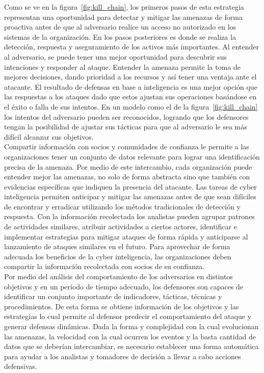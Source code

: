 Como se ve en la figura~\ref{fig:kill_chain}, los primeros pasos de esta estrategia representan una 
oportunidad para detectar y mitigar las amenazas de forma proactiva antes de que 
al adversario realice un acceso no autorizado en los sistemas de la 
organización. En los pasos posteriores es donde se realiza la detección, 
respuesta y aseguramiento de los activos más importantes. Al entender al 
adversario, se puede tener una mejor oportunidad para descubrir sus intenciones 
y responder al ataque. Entender la amenaza permite la toma de mejores 
decisiones, dando prioridad a los recursos y así tener una ventaja ante el atacante. 
El resultado de defensas en base a inteligencia es una mejor opción que las 
respuestas a los ataques dado que estos ajustan sus operaciones basándose en el 
éxito o falla de sus intentos. En un modelo como el de la figura~\ref{fig:kill_chain} los intentos 
del adversario pueden ser reconocidos, logrando que los defensores tengan la 
posibilidad de ajustar sus tácticas para que al adversario le sea más 
difícil alcanzar sus objetivos.\\

Compartir información con socios y comunidades de confianza le permite a las 
organizaciones tener un conjunto de datos relevante para lograr una 
identificación precisa de la amenaza. Por medio de este intercambio, cada organización 
puede entender mejor las amenazas, no 
solo de forma abstracta sino que también con evidencias específicas que 
indiquen la presencia del atacante. Las tareas de cyber inteligencia permiten 
anticipar y mitigar las amenazas antes de que sean difíciles de encontrar y 
erradicar utilizando los métodos tradicionales de detección y respuesta. Con la 
información recolectada los analistas pueden agrupar patrones de actividades 
similares, atribuir actividades a ciertos actores, identificar e implementar 
estrategias para mitigar ataques de forma rápida y anticiparse al lanzamiento de 
ataques similares en el futuro. Para aprovechar de forma adecuada los beneficios 
de la cyber inteligencia, las organizaciones deben compartir la información 
recolectada con socios de su confianza.\\

Por medio del análisis del comportamiento de los adversarios en distintos 
objetivos y en un período de tiempo adecuado, los defensores son capaces de 
identificar un conjunto importante de indicadores, tácticas, técnicas y 
procedimientos. De esta forma se obtiene información de los objetivos y las 
estrategias lo cual permite al defensor predecir el comportamiento del ataque y 
generar defensas dinámicas. Dada la forma y complejidad con la cual evolucionan 
las amenazas, la velocidad con la cual ocurren los eventos y la basta cantidad 
de datos que se deberían intercambiar, es necesario establecer una forma 
automática para ayudar a los analistas y tomadores de decisión a llevar a cabo 
acciones defensivas.\\

